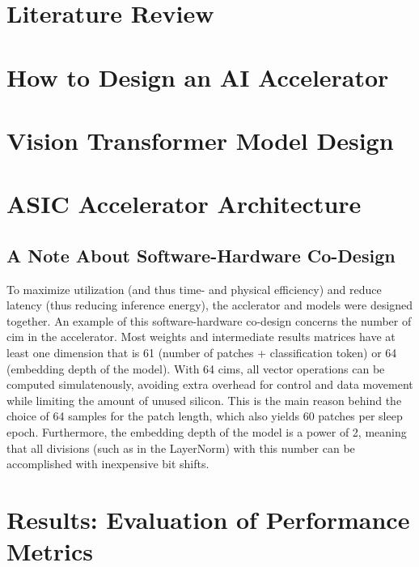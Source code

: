 \documentclass[12pt]{article}
\begin{document}
\section{Literature Review}

\label{sec:lit_review}

\newpage
\section{How to Design an AI Accelerator}
\label{sec:methods}


\newpage
\section{Vision Transformer Model Design}
\label{sec:vision_transformer}


\section{ASIC Accelerator Architecture}
\label{sec:arch}


\subsection{A Note About Software-Hardware Co-Design}
\label{sec:sw_hw_co-design}
To maximize utilization (and thus time- and physical efficiency) and reduce latency (thus reducing inference energy), the acclerator and models were designed together. An example
of this software-hardware co-design concerns the number of \ac{cim} in the accelerator. Most weights and intermediate results matrices have at least one dimension that is 61 (number
of patches + classification token) or 64 (embedding depth of the model). With 64 \ac{cim}s, all vector operations can be computed simulatenously, avoiding extra overhead for control
and data movement while limiting the amount of unused silicon. This is the main reason behind the choice of 64 samples for the patch length, which also yields 60 patches per sleep
epoch. Furthermore, the embedding depth of the model is a power of 2, meaning that all divisions (such as in the LayerNorm) with this number can be accomplished with inexpensive bit shifts.

\newpage
\section{Results: Evaluation of Performance Metrics}
\label{sec:results}

\end{document}
